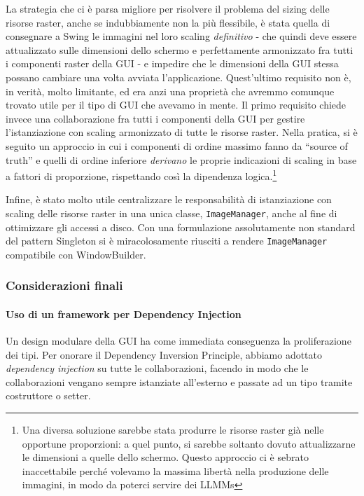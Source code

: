 La strategia che ci è parsa migliore per risolvere il problema del sizing delle risorse raster, anche se indubbiamente non la più flessibile, è stata quella di consegnare a Swing le immagini nel loro scaling \emph{definitivo} - che quindi deve essere attualizzato sulle dimensioni dello schermo e perfettamente armonizzato fra tutti i componenti raster della GUI - e impedire che le dimensioni della GUI stessa possano cambiare una volta avviata l'applicazione. Quest'ultimo requisito non è, in verità, molto limitante, ed era anzi una proprietà che avremmo comunque trovato utile per il tipo di GUI che avevamo in mente. Il primo requisito chiede invece una collaborazione fra tutti i componenti della GUI per gestire l'istanziazione con scaling armonizzato di tutte le risorse raster. Nella pratica, si è seguito un approccio in cui i componenti di ordine massimo fanno da ``source of truth'' e quelli di ordine inferiore \emph{derivano} le proprie indicazioni di scaling in base a fattori di proporzione, rispettando così la dipendenza logica.\footnote{Una diversa soluzione sarebbe stata produrre le risorse raster già nelle opportune proporzioni: a quel punto, si sarebbe soltanto dovuto attualizzarne le dimensioni a quelle dello schermo. Questo approccio ci è sebrato inaccettabile perché volevamo la massima libertà nella produzione delle immagini, in modo da poterci servire dei LLMMs}

Infine, è stato molto utile centralizzare le responsabilità di istanziazione con scaling delle risorse raster in una unica classe, \texttt{ImageManager}, anche al fine di ottimizzare gli accessi a disco. Con una formulazione assolutamente non standard del pattern Singleton si è miracolosamente riusciti a rendere \texttt{ImageManager} compatibile con WindowBuilder.


\subsubsection{Considerazioni finali}

\paragraph{Uso di un framework per Dependency Injection}
Un design modulare della GUI ha come immediata conseguenza la proliferazione dei tipi. Per onorare il Dependency Inversion Principle, abbiamo adottato \emph{dependency injection} su tutte le collaborazioni, facendo in modo che le collaborazioni vengano sempre istanziate all'esterno e passate ad un tipo tramite costruttore o setter.

